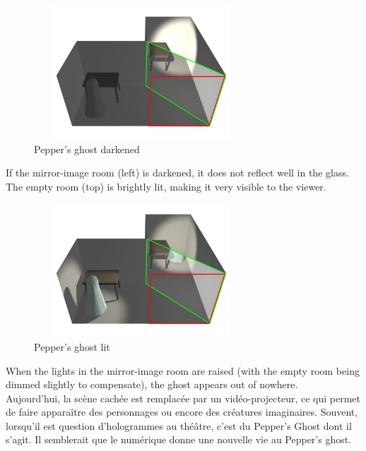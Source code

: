 \clearpage

\begin{figure}[h!]
\centering\includegraphics[width=8cm,height=5cm]{image/Peppers2.jpg}
\caption{Pepper's ghost darkened\cite{Peppers-ghost}}
\label{fig:paraba}
\end{figure}
If the mirror-image room (left) is darkened, it does not reflect well in the glass. The empty room (top) is brightly lit, making it very visible to the viewer.\cite{Peppers-ghost}

\begin{figure}[h!]
\centering\includegraphics[width=8cm,height=5cm]{image/Peppers3.jpg}
\caption{Pepper's ghost lit\cite{Peppers-ghost}}
\label{fig:paraba}
\end{figure}

When the lights in the mirror-image room are raised (with the empty room being dimmed slightly to compensate), the ghost appears out of nowhere.\cite{Peppers-ghost}\\

Aujourd’hui, la scène cachée est remplacée par un vidéo-projecteur, ce qui permet de faire apparaître des personnages ou encore des créatures imaginaires. Souvent, lorsqu’il est question d’hologrammes au théâtre, c’est du Pepper’s Ghost dont il s’agit. Il semblerait que le numérique donne une nouvelle vie au Pepper’s ghost.
